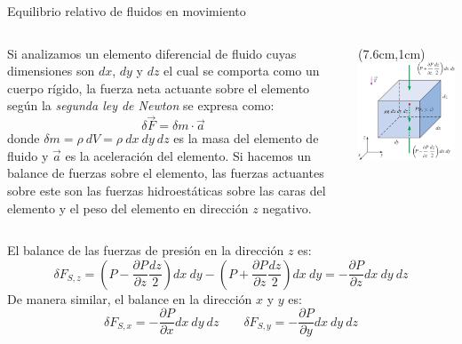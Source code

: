 \documentclass [xcolor=svgnames, t] {beamer}
\begin{document}
\begin{frame}{Equilibrio relativo de fluidos en movimiento}
\footnotesize
\vspace{-0.4cm}
\begin{columns}
Si analizamos un elemento diferencial de fluido cuyas dimensiones son $dx$, $dy$ y $dz$  el cual se comporta como un cuerpo r\'igido, la fuerza neta actuante sobre el elemento seg\'un la \emph{segunda ley de Newton} se expresa como:
$$
\delta \vec{F} = \delta m \cdot \vec{a}
$$
donde $\delta m = \rho\ dV = \rho\ dx\ dy\ dz$ es la masa del elemento de fluido y $\vec{a}$ es la aceleraci\'on del elemento. 
Si hacemos un balance de fuerzas sobre el elemento, las fuerzas actuantes sobre este son las fuerzas hidroest\'aticas sobre las caras del elemento  y el peso del elemento en direcci\'on $z$ negativo.
\begin{textblock*}{5cm}(7.6cm,1cm) %
\includegraphics[width=\textwidth]{body}
\end{textblock*}
\end{columns}
\vspace{0.5cm}
El balance de las fuerzas de presi\'on en la direcci\'on $z$ es:
$$
\delta F_{S,z} = \left( P - \frac{\partial P}{\partial z} \frac{dz}{2} \right) dx\ dy - \left( P + \frac{\partial P}{\partial z} \frac{dz}{2} \right) dx\ dy = -\frac{\partial P}{\partial z} dx\ dy\ dz
$$
De manera similar, el balance en la direcci\'on $x$ y $y$ es:
$$
\delta F_{S,x} =  -\frac{\partial P}{\partial x} dx\ dy\ dz \quad \quad  \delta F_{S,y} =  -\frac{\partial P}{\partial y} dx\ dy\ dz
$$
\end{frame}
\end{document}
